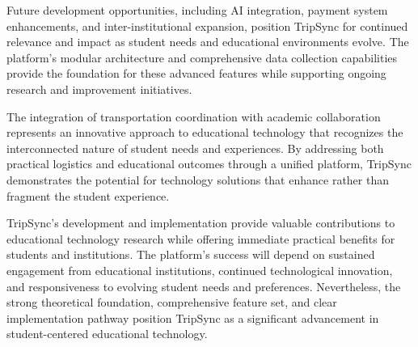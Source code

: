 \documentclass[conference]{IEEEtran}
\begin{document}
Future development opportunities, including AI integration, payment system enhancements, and inter-institutional expansion, position TripSync for continued relevance and impact as student needs and educational environments evolve. The platform's modular architecture and comprehensive data collection capabilities provide the foundation for these advanced features while supporting ongoing research and improvement initiatives.

The integration of transportation coordination with academic collaboration represents an innovative approach to educational technology that recognizes the interconnected nature of student needs and experiences. By addressing both practical logistics and educational outcomes through a unified platform, TripSync demonstrates the potential for technology solutions that enhance rather than fragment the student experience.

TripSync's development and implementation provide valuable contributions to educational technology research while offering immediate practical benefits for students and institutions. The platform's success will depend on sustained engagement from educational institutions, continued technological innovation, and responsiveness to evolving student needs and preferences. Nevertheless, the strong theoretical foundation, comprehensive feature set, and clear implementation pathway position TripSync as a significant advancement in student-centered educational technology.
\end{document}
